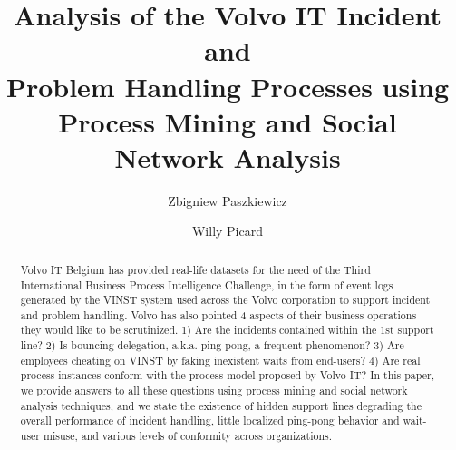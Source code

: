 \documentclass[lnbip]{svmultln}
\begin{document}
%
\mainmatter              %
%
\title{Analysis of the Volvo IT Incident and \\
Problem Handling Processes using \\
Process Mining and Social Network Analysis}


\author{Zbigniew Paszkiewicz \and Willy Picard}


\maketitle

\begin{abstract}        %
Volvo IT Belgium has provided real-life datasets for the need of the Third International Business Process Intelligence Challenge, in the form of event logs generated by the VINST system used across the Volvo corporation to support incident and problem handling. Volvo has also pointed 4 aspects of their business operations they would like to be scrutinized. 1) Are the incidents contained within the 1st support line? 2) Is bouncing delegation, a.k.a. ping-pong, a frequent phenomenon? 3) Are employees cheating on VINST by faking inexistent waits from end-users? 4) Are real process instances conform with the process model proposed by Volvo IT? In this paper, we provide answers to all these questions using process mining and social network analysis techniques, and we state the existence of hidden support lines degrading the overall performance of incident handling, little localized ping-pong behavior and wait-user misuse, and various levels of conformity across organizations.
\end{abstract}
%
\end{document}
